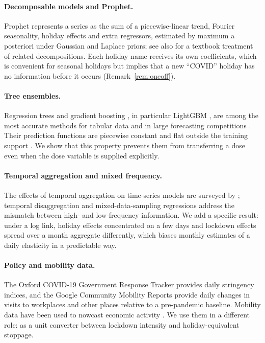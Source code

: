 \documentclass{article}
\theoremstyle{plain}
\theoremstyle{definition}
\theoremstyle{remark}
\begin{document}
\paragraph{Decomposable models and Prophet.} Prophet \citep{taylor2018forecasting} represents a series as the sum of a piecewise-linear trend, Fourier seasonality, holiday effects and extra regressors, estimated by maximum a posteriori under Gaussian and Laplace priors; see also \citet{hyndman2021fpp} for a textbook treatment of related decompositions. Each holiday name receives its own coefficients, which is convenient for seasonal holidays but implies that a new ``COVID'' holiday has no information before it occurs (Remark~\ref{rem:oneoff}).

\paragraph{Tree ensembles.} Regression trees \citep{breiman1984cart} and gradient boosting \citep{friedman2001greedy}, in particular LightGBM \citep{ke2017lightgbm}, are among the most accurate methods for tabular data \citep{grinsztajn2022tree} and in large forecasting competitions \citep{makridakis2022m5}. Their prediction functions are piecewise constant and flat outside the training support \citep{hastie2009elements, januschowski2022trees}. We show that this property prevents them from transferring a dose even when the dose variable is supplied explicitly.

\paragraph{Temporal aggregation and mixed frequency.} The effects of temporal aggregation on time-series models are surveyed by \citet{silvestrini2008aggregation}; temporal disaggregation \citep{chow1971interpolation, denton1971adjustment} and mixed-data-sampling regressions \citep{ghysels2007midas} address the mismatch between high- and low-frequency information. We add a specific result: under a log link, holiday effects concentrated on a few days and lockdown effects spread over a month aggregate differently, which biases monthly estimates of a daily elasticity in a predictable way.

\paragraph{Policy and mobility data.} The Oxford COVID-19 Government Response Tracker \citep{hale2021oxcgrt} provides daily stringency indices, and the Google Community Mobility Reports \citep{google2022mobility} provide daily changes in visits to workplaces and other places relative to a pre-pandemic baseline. Mobility data have been used to nowcast economic activity \citep{sampi2020nowcasting}. We use them in a different role: as a unit converter between lockdown intensity and holiday-equivalent stoppage.
\end{document}
